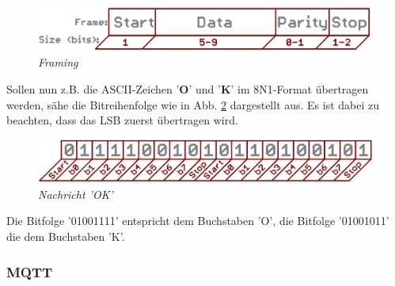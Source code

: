 \vspace{0.5cm}

\begin{figure}[h]
    \vspace{-\baselineskip}
        \centering
        \includegraphics[scale=0.3]{Pictures/uart_framing.png}
        \caption{\textit{Framing \citep{ImgRXTX}}}
        \label{img:uart_framing}
\end{figure}

Sollen nun z.B. die ASCII-Zeichen '\textbf{O}' und '\textbf{K}' im 8N1-Format übertragen werden, 
sähe die Bitreihenfolge wie in Abb. \ref{img:uart_ok} dargestellt aus. Es ist dabei zu beachten, dass das
\acs{LSB} zuerst übertragen wird.

\vspace{0.5cm}

\begin{figure}[h]
    \vspace{-\baselineskip}
        \centering
        \includegraphics[scale=0.3]{Pictures/uart_ok.png}
        \caption{\textit{Nachricht 'OK' \citep{ImgRXTX}}}
        \label{img:uart_ok}
\end{figure}

Die Bitfolge '01001111' entspricht dem Buchstaben 'O', die Bitfolge '01001011' die dem Buchstaben 'K'.



\subsubsection{MQTT} 
